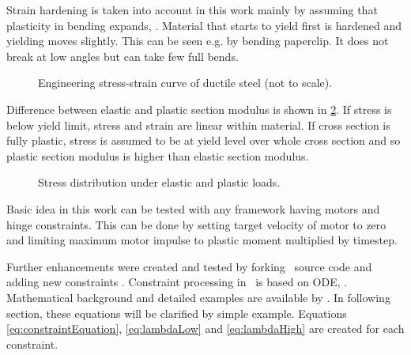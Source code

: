 Strain hardening is taken into account in this work mainly by assuming that plasticity in bending expands, \citet[p.~672]{dowling}.
Material that starts to yield first is hardened and yielding moves slightly.
This can be seen e.g. by bending paperclip. It does not break at low angles but can take few full bends. 

\begin{figure}[htb!]
\centering
{}
\caption{Engineering stress-strain curve of ductile steel (not to scale).}
\label{fig:sscurve}
\end{figure}

Difference between elastic and plastic section modulus is shown in \ref{fig:wp}. 
If stress is below yield limit, stress and strain are linear within material.
If cross section is fully plastic, stress is assumed to be at yield level over whole cross section and 
so plastic section modulus is higher than elastic section modulus.

\begin{figure}[htb!]
\centering
{}
\hspace{1cm}
\caption{Stress distribution under elastic and plastic loads.}
\label{fig:wp}
\end{figure}

Basic idea in this work can be tested with any framework having motors and hinge constraints.
This can be done by setting target velocity of motor to zero and limiting maximum motor impulse to plastic moment 
multiplied by timestep.

Further enhancements were created and tested by forking \bullet\ source code
and adding new constraints \cite{pbullet}.
Constraint processing in \bullet\ is based on ODE, \cite{ode}.
Mathematical background and detailed examples are available by \cite{ode.joints}.
In following section, these equations will be clarified by simple example.
Equations \ref{eq:constraintEquation}, \ref{eq:lambdaLow} and
\ref{eq:lambdaHigh} 
are created for each constraint.

